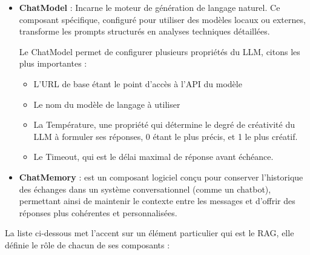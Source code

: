 \documentclass[12pt,a4paper]{report}
\begin{document}
\begin{itemize}
\begin{itemize}
		\end{itemize}
		
		\item \textbf{ChatModel} : Incarne le moteur de génération de langage naturel. Ce composant spécifique, configuré pour utiliser des modèles locaux ou externes, transforme les prompts structurés en analyses techniques détaillées.
		
		Le ChatModel permet de configurer plusieurs propriétés du LLM, citons les plus importantes :
		
		\begin{itemize}
			
			\item L'URL de base étant le point d'accès à l'API du modèle
			
			\item Le nom du modèle de langage à utiliser
			
			\item La Température, une propriété qui détermine le degré de créativité du LLM à formuler ses réponses, 0 étant le plus précis, et 1 le plus créatif.
			
			\item Le Timeout, qui est le délai maximal de réponse avant échéance.
			
		\end{itemize}
		
		\item \textbf{ChatMemory} : est un composant logiciel conçu pour conserver l’historique des échanges dans un système conversationnel (comme un chatbot), permettant ainsi de maintenir le contexte entre les messages et d’offrir des réponses plus cohérentes et personnalisées.
		
	\end{itemize}
	
	La liste ci-dessous met l'accent sur un élément particulier qui est le RAG, elle définie le rôle de chacun de ses composants :
	
\end{document}
